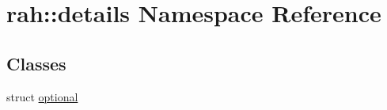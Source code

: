 \hypertarget{namespacerah_1_1details}{}\section{rah\+::details Namespace Reference}
\label{namespacerah_1_1details}
\subsection*{Classes}
\begin{DoxyCompactItemize}
\item 
struct \mbox{\hyperlink{structrah_1_1details_1_1optional}{optional}}
\end{DoxyCompactItemize}
